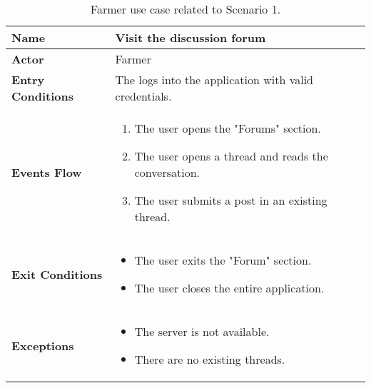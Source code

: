 \begin{table}[hbt!]
\centering
\caption{\label{tab:addOne{table_counter}}Farmer use case related to Scenario 1.}
\renewcommand{\arraystretch}{1.25}
\begin{tabular}{|l|>{\raggedright\arraybackslash}m{12cm}|}

    \hline
    \textbf{Name} & Visit the discussion forum\\
    \hline
   	\textbf{Actor} & Farmer\\
    \hline
    \textbf{Entry Conditions} & The logs into the application with valid credentials.\\
    \hline
    \textbf{Events Flow} & 
    		\begin{enumerate}
    			\item The user opens the "Forums" section.
    			\item The user opens a thread and reads the conversation.
    			\item The user submits a post in an existing thread.
    		\end{enumerate}
    	\\
    \hline
    \textbf{Exit Conditions} & \begin{itemize}
    	\item The user exits the "Forum" section.
    	\item The user closes the entire application.\end{itemize}\\
    \hline
    \textbf{Exceptions} & 
    		\begin{itemize}
    			\item The server is not available.
    			\item There are no existing threads.
    		\end{itemize}
    	\\
    \hline
\end{tabular}
\end{table}